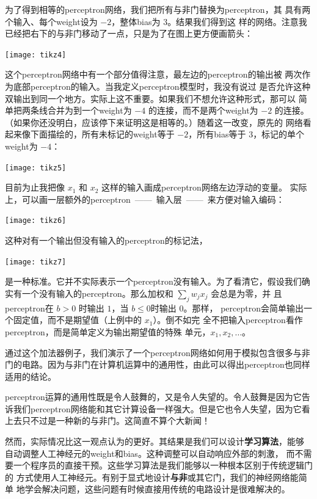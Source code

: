 为了得到相等的\gls*{perceptron}网络，我们把所有与非门替换为\gls*{perceptron}，其
具有两个输入、每个\gls*{weight}设为 $-2$，整体\gls*{bias}为 $3$。结果我们得到这
样的网络。注意我已经把右下的与非门移动了一点，只是为了在图上更方便画箭头：
\begin{center}
  \texttt{[image: tikz4]}
\end{center}

这个\gls*{perceptron}网络中有一个部分值得注意，最左边的\gls*{perceptron}的输出被
两次作为底部\gls*{perceptron}的输入。当我定义\gls*{perceptron}模型时，我没有说过
是否允许这种双输出到同一个地方。实际上这不重要。如果我们不想允许这种形式，那可以
简单把两条线合并为到一个\gls*{weight}为 $-4$ 的连接，而不是两个\gls*{weight}为
$-2$ 的连接。（如果你还没明白，应该停下来证明这是相等的。）随着这一改变，原先的
网络看起来像下面描绘的，所有未标记的\gls*{weight}等于 $-2$，所有\gls*{bias}等于
$3$，标记的单个\gls*{weight}为 $-4$：
\begin{center}
  \texttt{[image: tikz5]}
\end{center}

目前为止我把像 $x_1$ 和 $x_2$ 这样的输入画成\gls*{perceptron}网络左边浮动的变量。
实际上，可以画一层额外的\gls*{perceptron}~——~输入层~——~来方便对输入编码：
\begin{center}
  \texttt{[image: tikz6]}
\end{center}

这种对有一个输出但没有输入的\gls*{perceptron}的标记法，
\begin{center}
  \texttt{[image: tikz7]}
\end{center}
是一种标准。它并不实际表示一个\gls*{perceptron}没有输入。为了看清它，假设我们确
实有一个没有输入的\gls*{perceptron}。那么加权和 $\sum_j w_j x_j$ 会总是为零，并
且\gls*{perceptron}在 $b > 0$ 时输出 $1$，当 $b \leq 0$时输出 $0$。那样，%
\gls*{perceptron}会简单输出一个固定值，而不是期望值（上例中的 $x_1$）。倒不如完
全不把输入\gls*{perceptron}看作\gls*{perceptron}，而是简单定义为输出期望值的特殊
单元，$x_1, x_2,\ldots$。

通过这个加法器例子，我们演示了一个\gls*{perceptron}⽹络如何用于模拟包含很多与非
门的电路。因为与非门在计算机运算中的通用性，由此可以得出\gls*{perceptron}也同样
适用的结论。

\gls*{perceptron}运算的通用性既是令人鼓舞的，又是令人失望的。令人鼓舞是因为它告
诉我们\gls*{perceptron}网络能和其它计算设备一样强大。但是它也令人失望，因为它看
上去只不过是一种新的与非门。这简直不算个大新闻！

然而，实际情况比这一观点认为的更好。其结果是我们可以设计\textbf{学习算法}，能够
自动调整人工神经元的\gls*{weight}和\gls*{bias}。这种调整可以自动响应外部的刺激，
而不需要一个程序员的直接干预。这些学习算法是我们能够以一种根本区别于传统逻辑门的
方式使用人工神经元。有别于显式地设计\textbf{与非}或其它门，我们的神经网络能简单
地学会解决问题，这些问题有时候直接用传统的电路设计是很难解决的。

